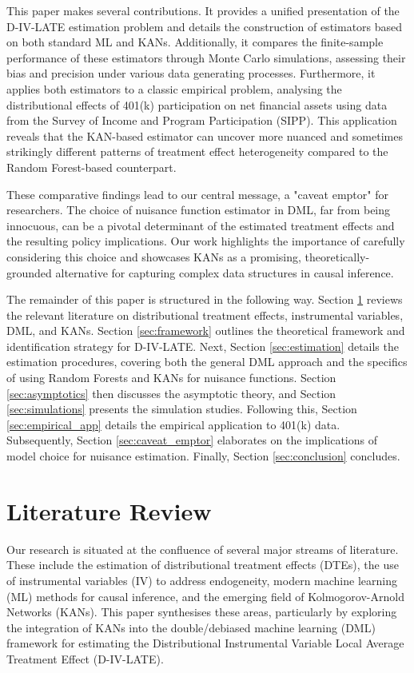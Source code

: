 \documentclass[final,3p,fleqn, 10pt]{elsarticle}
\begin{document}
This paper makes several contributions. It provides a unified presentation of the D-IV-LATE estimation problem and details the construction of estimators based on both standard ML and KANs. Additionally, it compares the finite-sample performance of these estimators through Monte Carlo simulations, assessing their bias and precision under various data generating processes. Furthermore, it applies both estimators to a classic empirical problem, analysing the distributional effects of 401(k) participation on net financial assets using data from the Survey of Income and Program Participation (SIPP). This application reveals that the KAN-based estimator can uncover more nuanced and sometimes strikingly different patterns of treatment effect heterogeneity compared to the Random Forest-based counterpart.

These comparative findings lead to our central message, a "caveat emptor" for researchers. The choice of nuisance function estimator in DML, far from being innocuous, can be a pivotal determinant of the estimated treatment effects and the resulting policy implications. Our work highlights the importance of carefully considering this choice and showcases KANs as a promising, theoretically-grounded alternative for capturing complex data structures in causal inference.

The remainder of this paper is structured in the following way. Section \ref{sec:lit_review} reviews the relevant literature on distributional treatment effects, instrumental variables, DML, and KANs. Section \ref{sec:framework} outlines the theoretical framework and identification strategy for D-IV-LATE. Next, Section \ref{sec:estimation} details the estimation procedures, covering both the general DML approach and the specifics of using Random Forests and KANs for nuisance functions. Section \ref{sec:asymptotics} then discusses the asymptotic theory, and Section \ref{sec:simulations} presents the simulation studies. Following this, Section \ref{sec:empirical_app} details the empirical application to 401(k) data. Subsequently, Section \ref{sec:caveat_emptor} elaborates on the implications of model choice for nuisance estimation. Finally, Section \ref{sec:conclusion} concludes.

\section{Literature Review}
\label{sec:lit_review}

Our research is situated at the confluence of several major streams of literature. These include the estimation of distributional treatment effects (DTEs), the use of instrumental variables (IV) to address endogeneity, modern machine learning (ML) methods for causal inference, and the emerging field of Kolmogorov-Arnold Networks (KANs). This paper synthesises these areas, particularly by exploring the integration of KANs into the double/debiased machine learning (DML) framework for estimating the Distributional Instrumental Variable Local Average Treatment Effect (D-IV-LATE).
\end{document}
